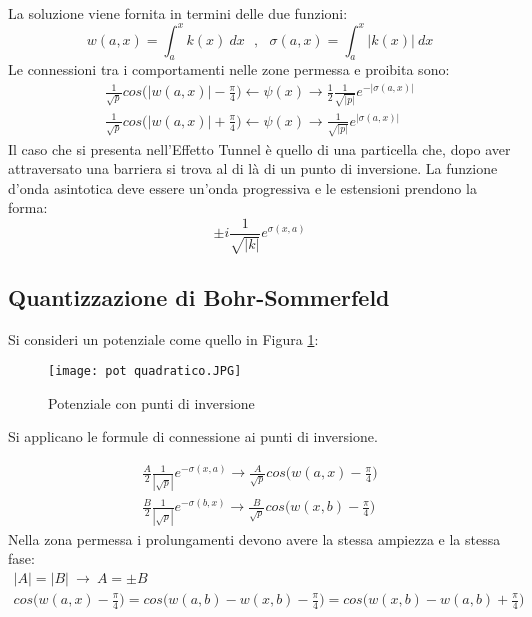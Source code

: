 \documentclass[twoside]{article}
\begin{document}
\\
La soluzione viene fornita in termini delle due funzioni:
\begin{equation} \label{8.0.10}
    w(a,x)=\int_{a}^{x}k(x) \ dx \ \ \ , \ \ \ \sigma(a,x)=\int_{a}^{x}|k(x)| \ dx
\end{equation}
Le connessioni tra i comportamenti nelle zone permessa e proibita sono:
\begin{equation} \label{8.0.11}
    \begin{array}{lr}
        \frac{1}{\sqrt{p}}cos\biggl( |w(a,x)|-\frac{\pi}{4} \biggr) \leftarrow \psi(x) \rightarrow \frac{1}{2}\frac{1}{\sqrt{|p|}}e^{-|\sigma(a,x)|} \\
        \frac{1}{\sqrt{p}}cos\biggl( |w(a,x)|+\frac{\pi}{4} \biggr) \leftarrow \psi(x) \rightarrow \frac{1}{\sqrt{|p|}}e^{|\sigma(a,x)|}
    \end{array}
\end{equation}
Il caso che si presenta nell'Effetto Tunnel è quello di una particella che, dopo aver attraversato una barriera si trova al di là di un punto di inversione.
La funzione d'onda asintotica deve essere un'onda progressiva e le estensioni prendono la forma:
\begin{equation}
    \pm i \frac{1}{\sqrt{|k|}}e^{\sigma(x,a)}
\end{equation}

\vspace{0.5cm}

\subsection{Quantizzazione di Bohr-Sommerfeld}

Si consideri un potenziale come quello in Figura \ref{inversione}:

\begin{figure}[ht]
\centering
\texttt{[image: pot quadratico.JPG]}
\caption{Potenziale con punti di inversione}
\label{inversione}
\end{figure}

Si applicano le formule di connessione ai punti di inversione.

\begin{equation} \begin{split}
    \frac{A}{2}\frac{1}{|\sqrt{p}|}e^{-\sigma(x,a)} \rightarrow \frac{A}{\sqrt{p}}cos\biggl( w(a,x) - \frac{\pi}{4} \biggr) \\
    \frac{B}{2}\frac{1}{|\sqrt{p}|}e^{-\sigma(b,x)} \rightarrow \frac{B}{\sqrt{p}}cos\biggl( w(x,b) - \frac{\pi}{4} \biggr)
\end{split} \end{equation}
Nella zona permessa i prolungamenti devono avere la stessa ampiezza e  la stessa fase:
\begin{equation}
    \begin{split}
        |A|=|B| \ \rightarrow \ A=\pm B \ \ \ \ \ \ \ \ \ \ \ \ \ \ \ \ \ \ \ \ \ \ \ \ \ \ \ \ \ \ \ \ \ \\
        cos\biggl( w(a,x) - \frac{\pi}{4} \biggr)=cos\biggl( w(a,b)-w(x,b) -\frac{\pi}{4} \biggr)=cos\biggl( w(x,b)-w(a,b)+\frac{\pi}{4} \biggr)
    \end{split}
\end{equation}
\end{document}
